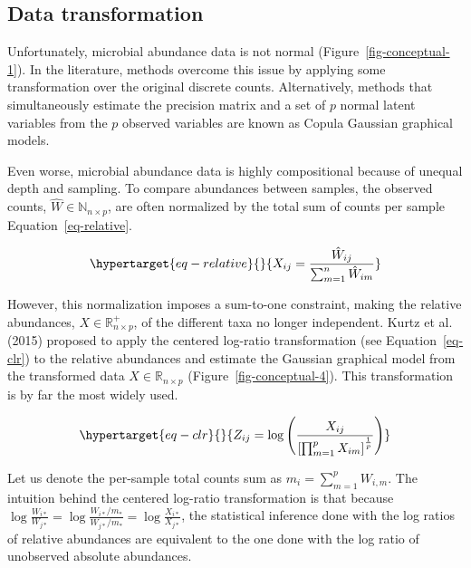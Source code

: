 \documentclass[
  a4paper,
]{article}
\begin{document}
\hypertarget{data-transformation}{%
\subsection{Data transformation}\label{data-transformation}}

Unfortunately, microbial abundance data is not normal
(Figure~\ref{fig-conceptual-1}). In the literature, methods overcome
this issue by applying some transformation over the original discrete
counts. Alternatively, methods that simultaneously estimate the
precision matrix and a set of \(p\) normal latent variables from the
\(p\) observed variables are known as Copula Gaussian graphical models.

Even worse, microbial abundance data is highly compositional because of
unequal depth and sampling. To compare abundances between samples, the
observed counts, \(\hat W\in \mathbb N_{n \times p}\), are often
normalized by the total sum of counts per sample
Equation~\ref{eq-relative}.

\begin{equation}\protect\hypertarget{eq-relative}{}{
X_{ij} = \frac{\hat W_{ij}}{\sum_{m=1}^n \hat W_{im}}
}\label{eq-relative}\end{equation}

However, this normalization imposes a sum-to-one constraint, making the
relative abundances, \(X \in \mathbb R^+_{n\times p}\), of the different
taxa no longer independent. Kurtz et al. (2015) proposed to apply the
centered log-ratio transformation (see Equation~\ref{eq-clr}) to the
relative abundances and estimate the Gaussian graphical model from the
transformed data \(X \in \mathbb R_{n\times p}\)
(Figure~\ref{fig-conceptual-4}). This transformation is by far the most
widely used.

\begin{equation}\protect\hypertarget{eq-clr}{}{
Z_{ij} = \log \left (\frac{X_{ij}}{\left [ \prod_{m=1}^pX_{im}\right]^{\frac 1 p}}\right )
}\label{eq-clr}\end{equation}

Let us denote the per-sample total counts sum as
\(m_i = \sum_{m=1}^p W_{i,m}\). The intuition behind the centered
log-ratio transformation is that because
\(\log{\frac {W_{i*}}{W_{j*}}} = \log{\frac {W_{i*}/m_*}{W_{j*}/m_*}} = \log{\frac {X_{i*}}{X_{j*}}}\),
the statistical inference done with the log ratios of relative
abundances are equivalent to the one done with the log ratio of
unobserved absolute abundances.
\end{document}
